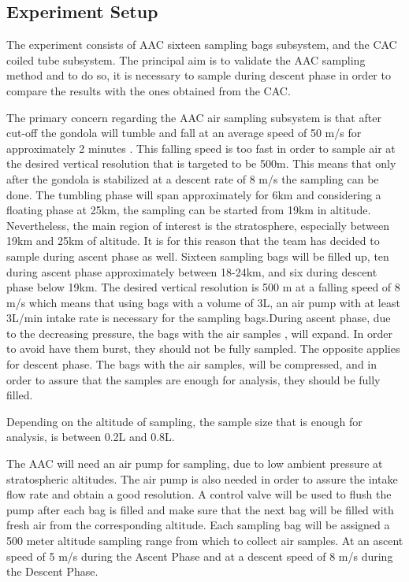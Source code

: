 \subsection{Experiment Setup} \label{Experiment_Setup}

The experiment consists of AAC sixteen sampling bags subsystem, and the CAC coiled tube subsystem. The principal aim is to validate the AAC sampling method and to do so, it is necessary to sample during descent phase in order to compare the results with the ones obtained from the CAC.

The primary concern regarding the AAC air sampling subsystem is that after cut-off the gondola will tumble and fall at an average speed of 50 m/s for approximately 2 minutes \cite{BexusManual}. This falling speed is too fast in order to sample air at the desired vertical resolution that is targeted to be 500m. This means that only after the gondola is stabilized at a descent rate of 8 m/s the sampling can be done. The tumbling phase will span approximately for 6km and considering a floating phase at 25km, the sampling can be started from 19km in altitude. Nevertheless, the main region of interest is the stratosphere, especially between 19km and 25km of altitude. It is for this reason that the team has decided to sample during ascent phase as well. Sixteen sampling bags will be filled up, ten during ascent phase approximately between 18-24km, and six during descent phase below 19km. The desired vertical resolution is 500 m at a falling speed of 8 m/s which means that using bags with a volume of 3L, an air pump with at least 3L/min intake rate is necessary for the sampling bags.During ascent phase, due to the decreasing pressure, the bags with the air samples , will expand. In order to avoid have them burst, they should not be fully sampled. The opposite applies for descent phase. The bags with the air samples, will be compressed, and in order to assure that the samples are enough for analysis, they should be fully filled.

Depending on the altitude of sampling, the sample size that is enough for analysis, is between 0.2L and 0.8L. 

The AAC will need an air pump for sampling, due to low ambient pressure at stratospheric altitudes. The air pump is also needed in order to assure the intake flow rate and obtain a good resolution. A control valve will be used to flush the pump after each bag is filled and make sure that the next bag will be filled with fresh air from the corresponding altitude. Each sampling bag will be assigned a 500 meter altitude sampling range from which to collect air samples. At an ascent speed of 5 m/s during the Ascent Phase and at a descent speed of 8 m/s during the Descent Phase. 


